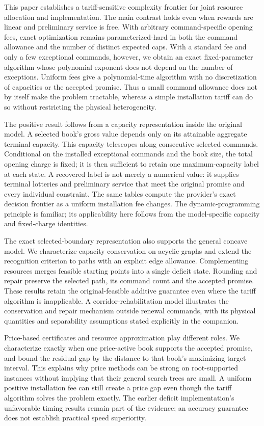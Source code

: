 \documentclass[11pt,letterpaper]{article}
\theoremstyle{definition}\newtheorem{remark}[theorem]{Remark}
\begin{document}
This paper establishes a tariff-sensitive complexity frontier for joint resource allocation and implementation. The main contrast holds even when rewards are linear and preliminary service is free. With arbitrary command-specific opening fees, exact optimization remains parameterized-hard in both the command allowance and the number of distinct expected caps. With a standard fee and only a few exceptional commands, however, we obtain an exact fixed-parameter algorithm whose polynomial exponent does not depend on the number of exceptions. Uniform fees give a polynomial-time algorithm with no discretization of capacities or the accepted promise. Thus a small command allowance does not by itself make the problem tractable, whereas a simple installation tariff can do so without restricting the physical heterogeneity.

The positive result follows from a capacity representation inside the original model. A selected book's gross value depends only on its attainable aggregate terminal capacity. This capacity telescopes along consecutive selected commands. Conditional on the installed exceptional commands and the book size, the total opening charge is fixed; it is then sufficient to retain one maximum-capacity label at each state. A recovered label is not merely a numerical value: it supplies terminal lotteries and preliminary service that meet the original promise and every individual constraint. The same tables compute the provider's exact decision frontier as a uniform installation fee changes. The dynamic-programming principle is familiar; its applicability here follows from the model-specific capacity and fixed-charge identities.

The exact selected-boundary representation also supports the general concave model. We characterize capacity conservation on acyclic graphs and extend the recognition criterion to paths with an explicit edge allowance. Complementing resources merges feasible starting points into a single deficit state. Rounding and repair preserve the selected path, its command count and the accepted promise. These results retain the original-feasible additive guarantee even where the tariff algorithm is inapplicable. A corridor-rehabilitation model illustrates the conservation and repair mechanism outside renewal commands, with its physical quantities and separability assumptions stated explicitly in the companion.

Price-based certificates and resource approximation play different roles. We characterize exactly when one price-active book supports the accepted promise, and bound the residual gap by the distance to that book's maximizing target interval. This explains why price methods can be strong on root-supported instances without implying that their general search trees are small. A uniform positive installation fee can still create a price gap even though the tariff algorithm solves the problem exactly. The earlier deficit implementation's unfavorable timing results remain part of the evidence; an accuracy guarantee does not establish practical speed superiority.
\end{document}
